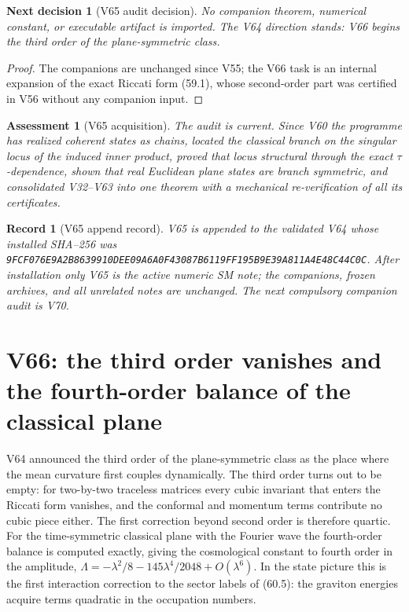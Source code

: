 \documentclass[11pt]{article}
\newtheorem{decision}[theorem]{Next decision}
\newtheorem{assessment}[theorem]{Assessment}
\newtheorem{record}[theorem]{Record}
\theoremstyle{remark}
\begin{document}
\begin{decision}[V65 audit decision]
\label{dec:v19v65-audit}
No companion theorem, numerical constant, or executable artifact is
imported.  The V64 direction stands: V66 begins the third order of the
plane-symmetric class.
\end{decision}

\begin{proof}
The companions are unchanged since V55; the V66 task is an internal
expansion of the exact Riccati form (59.1), whose second-order part
was certified in V56 without any companion input.
\end{proof}

\begin{assessment}[V65 acquisition]
\label{ass:v19v65}
The audit is current.  Since V60 the programme has realized coherent
states as chains, located the classical branch on the singular locus
of the induced inner product, proved that locus structural through
the exact \(\tau\)-dependence, shown that real Euclidean plane states
are branch symmetric, and consolidated V32--V63 into one theorem with
a mechanical re-verification of all its certificates.
\end{assessment}

\begin{record}[V65 append record]
\label{rec:v19v65}
V65 is appended to the validated V64 whose installed SHA--256 was
\texttt{9FCF076E9A2B8639910DEE09A6A0F43087B6119FF195B9E39A811A4E48C44C0C}.
After installation only V65 is the active numeric SM note; the
companions, frozen archives, and all unrelated notes are unchanged.  The
next compulsory companion audit is V70.
\end{record}


\section{V66: the third order vanishes and the fourth-order balance of the classical plane}
\label{sec:v19v66}

V64 announced the third order of the plane-symmetric class as the
place where the mean curvature first couples dynamically.  The third
order turns out to be empty: for two-by-two traceless matrices every
cubic invariant that enters the Riccati form vanishes, and the
conformal and momentum terms contribute no cubic piece either.  The
first correction beyond second order is therefore quartic.  For the
time-symmetric classical plane with the Fourier wave the fourth-order
balance is computed exactly, giving the cosmological constant to
fourth order in the amplitude, \(\Lambda=-\lambda^2/8-145\lambda^4/2048+O(\lambda^6)\).
In the state picture this is the first interaction correction to the
sector labels of (60.5): the graviton energies acquire terms quadratic
in the occupation numbers.
\end{document}
